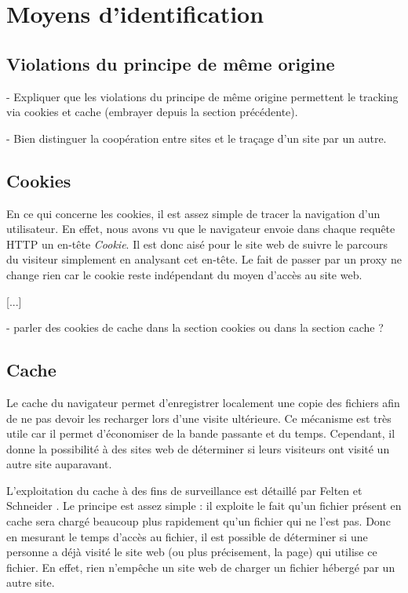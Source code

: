 \chapter{Moyens d'identification}
\section{Violations du principe de même origine}
- Expliquer que les violations du principe de même origine permettent le tracking via cookies et cache (embrayer depuis la section précédente).


- Bien distinguer la coopération entre sites et le traçage d'un site par un autre.


\section{Cookies}
En ce qui concerne les cookies, il est assez simple de tracer la navigation d'un utilisateur. En effet, nous avons vu que le navigateur envoie dans chaque requête HTTP un en-tête \textit{Cookie}. Il est donc aisé pour le site web de suivre le parcours du visiteur simplement en analysant cet en-tête. Le fait de passer par un proxy ne change rien car le cookie reste indépendant du moyen d'accès au site web.

[...]

- parler des cookies de cache dans la section cookies ou dans la section cache ?
\section{Cache}
Le cache du navigateur permet d'enregistrer localement une copie des fichiers afin de ne pas devoir les recharger lors d'une visite ultérieure. Ce mécanisme est très utile car il permet d'économiser de la bande passante et du temps. Cependant, il donne la possibilité à des sites web de déterminer si leurs visiteurs ont visité un autre site auparavant.

L'exploitation du cache à des fins de surveillance est détaillé par Felten et Schneider \cite{Felten:2000:TAW:352600.352606}.
Le principe est assez simple : il exploite le fait qu'un fichier présent en cache sera chargé beaucoup plus rapidement qu'un fichier qui ne l'est pas. Donc en mesurant le temps d'accès au fichier, il est possible de déterminer si une personne a déjà visité le site web (ou plus précisement, la page) qui utilise ce fichier. En effet, rien n'empêche un site web de charger un fichier hébergé par un autre site.
\newline

